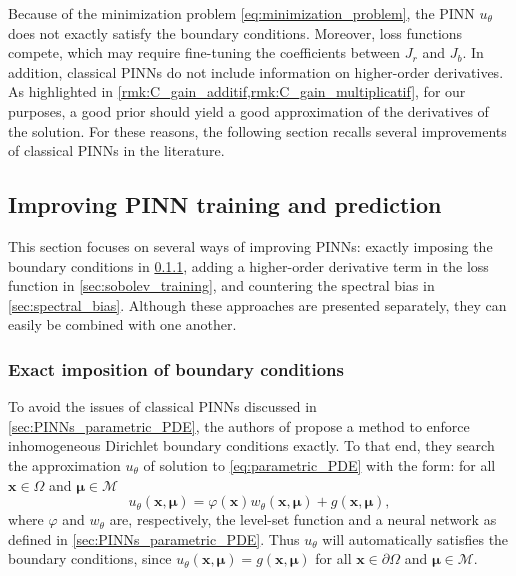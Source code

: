 Because of the minimization problem \eqref{eq:minimization_problem}, the PINN $u_\theta$ does not exactly satisfy the boundary conditions.
Moreover, loss functions compete, which may require fine-tuning the coefficients between $J_r$ and $J_b$.
In addition, classical PINNs do not include information on higher-order derivatives.
As highlighted in \cref{rmk:C_gain_additif,rmk:C_gain_multiplicatif}, for our purposes, a good prior should yield a good approximation of the derivatives of the solution.
For these reasons, the following section recalls several improvements of classical PINNs in the literature.

\subsection{Improving PINN training and prediction}\label{sec:improve_PINNs}

This section focuses on several ways of improving PINNs:
exactly imposing the boundary conditions in \cref{sec:exact_imposition_of_BC},
adding a higher-order derivative term in the loss function in \cref{sec:sobolev_training},
and countering the spectral bias in \cref{sec:spectral_bias}.
Although these approaches are presented separately,
they can easily be combined with one another.

\subsubsection{Exact imposition of boundary conditions}\label{sec:exact_imposition_of_BC}

To avoid the issues of classical PINNs discussed in \cref{sec:PINNs_parametric_PDE},
the authors of \cite{LagLikFot1998,FraMicNav2024}
propose a method to enforce inhomogeneous Dirichlet boundary conditions exactly.
To that end, they search the approximation $u_{\theta}$ of solution to \eqref{eq:parametric_PDE} with the form:
for all $\bm{x} \in \Omega$ and $\bm{\mu} \in \mathcal{M}$
\[
	u_{\theta}(\bm{x},\bm{\mu}) = \varphi(\bm{x}) w_{\theta}(\bm{x},\bm{\mu}) + g(\bm{x},\bm{\mu}),
\]
where $\varphi$ and $w_\theta$ are, respectively, the level-set function and a neural network as defined in \cref{sec:PINNs_parametric_PDE}.
Thus $u_{\theta}$ will automatically satisfies the boundary conditions, since
$u_{\theta}(\bm{x},\bm{\mu}) = g(\bm{x},\bm{\mu})$ for all $\bm{x} \in \partial \Omega$ and $\bm{\mu} \in \mathcal{M}$.

